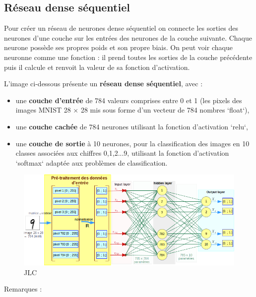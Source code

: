 \documentclass{article}
\begin{document}
\subsection{Réseau dense séquentiel}

Pour créer un réseau de neurones dense séquentiel on connecte les sorties 
des neurones d'une couche sur les entrées des neurones de la couche suivante. 
Chaque neurone possède ses propres poids et son propre biais. 
On peut voir chaque neuronne comme une fonction : 
il prend toutes les sorties de la couche précédente 
puis il calcule et renvoit la valeur de sa fonction d'activation.

\bigskip

L'image ci-dessous présente un \textbf{réseau dense séquentiel}, avec :

\begin{itemize}

\item une \textbf{couche d'entrée} de 784 valeurs comprises entre 0 et 1 (les pixels des 
images MNIST 28 $\times$ 28 mis sous forme d'un vecteur de 784 nombres `float`),

\item une \textbf{couche cachée} de 784 neurones utilisant la fonction d'activation `relu`,

\item une \textbf{couche de sortie} à 10 neurones, pour la classification des images en 10 
classes associées aux chiffres {0,1,2...9}, utilisant la fonction d'activation 
`softmax` adaptée aux problèmes de classification.

\end{itemize}

\begin{figure}[H]
\centering
\includegraphics[width=1\textwidth]{img/archiReseau.png}
JLC
\end{figure}

Remarques : 
\end{document}
